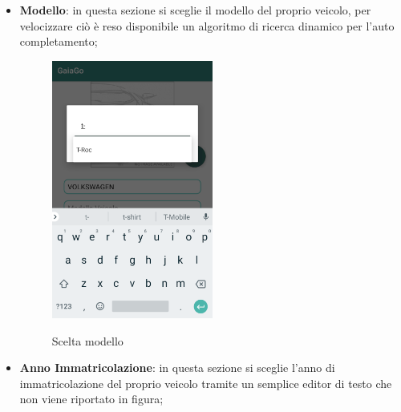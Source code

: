\begin{itemize}
\item \textbf{Modello}: in questa sezione si sceglie il modello del proprio veicolo, per velocizzare ciò è reso disponibile un algoritmo di ricerca dinamico per l'auto completamento;
 \begin{figure}[H] 
	\centering 
	\includegraphics[width=0.5\textwidth]{res/images/modello_auto.png}\\
	\caption{Scelta modello}
	\label{modello}
\end{figure}

\item \textbf{Anno Immatricolazione}: in questa sezione si sceglie l'anno di immatricolazione del proprio veicolo tramite un semplice editor di testo che non viene riportato in figura;
\pagebreak


\end{itemize}
